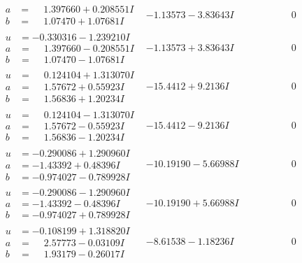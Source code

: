 \documentclass[1p]{elsarticle_modified}
\theoremstyle{definition}
\begin{document}
$$\begin{array}{c|c|c}
\begin{aligned}
a &= \phantom{-}1.397660 + 0.208551 I \\
b &= \phantom{-}1.07470 + 1.07681 I\end{aligned}
 & -1.13573 - 3.83643 I & \phantom{-0.000000 } 0 \\ \hline\begin{aligned}
u &= -0.330316 - 1.239210 I \\
a &= \phantom{-}1.397660 - 0.208551 I \\
b &= \phantom{-}1.07470 - 1.07681 I\end{aligned}
 & -1.13573 + 3.83643 I & \phantom{-0.000000 } 0 \\ \hline\begin{aligned}
u &= \phantom{-}0.124104 + 1.313070 I \\
a &= \phantom{-}1.57672 + 0.55923 I \\
b &= \phantom{-}1.56836 + 1.20234 I\end{aligned}
 & -15.4412 + 9.2136 I & \phantom{-0.000000 } 0 \\ \hline\begin{aligned}
u &= \phantom{-}0.124104 - 1.313070 I \\
a &= \phantom{-}1.57672 - 0.55923 I \\
b &= \phantom{-}1.56836 - 1.20234 I\end{aligned}
 & -15.4412 - 9.2136 I & \phantom{-0.000000 } 0 \\ \hline\begin{aligned}
u &= -0.290086 + 1.290960 I \\
a &= -1.43392 + 0.48396 I \\
b &= -0.974027 - 0.789928 I\end{aligned}
 & -10.19190 - 5.66988 I & \phantom{-0.000000 } 0 \\ \hline\begin{aligned}
u &= -0.290086 - 1.290960 I \\
a &= -1.43392 - 0.48396 I \\
b &= -0.974027 + 0.789928 I\end{aligned}
 & -10.19190 + 5.66988 I & \phantom{-0.000000 } 0 \\ \hline\begin{aligned}
u &= -0.108199 + 1.318820 I \\
a &= \phantom{-}2.57773 - 0.03109 I \\
b &= \phantom{-}1.93179 - 0.26017 I\end{aligned}
 & -8.61538 - 1.18236 I & \phantom{-0.000000 } 0 \\ \hline\begin{aligned}

\end{aligned}
\end{array}$$
\end{document}
